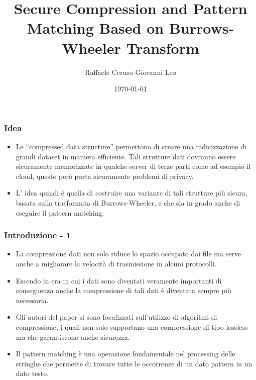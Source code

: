 \documentclass{beamer}
\title[]{Secure Compression and Pattern Matching Based on Burrows-Wheeler Transform}
\author{Raffaele Ceruso Giovanni Leo}
\date{\today}
\begin{document}
\begin{frame}
\titlepage
\end{frame}
\begin{frame}
\frametitle{Idea}
	\begin{itemize}
		\item Le ``compressed data structure'' permettono di creare una indicizzazione di grandi dataset in maniera efficiente. Tali strutture dati dovranno essere sicuramente memorizzate in qualche server di terze parti come ad esempio il cloud, questo però porta sicuramente problemi di privacy. 
		\item L’ idea quindi é quella di costruire una variante di tali strutture più sicura, basata sulla trasformata di Burrows-Wheeler, e che sia in grado anche di eseguire il pattern matching.
	\end{itemize}
\end{frame}
\begin{frame}
\frametitle{Introduzione - 1}
	\begin{itemize}
	 \item La compressione dati non solo riduce lo spazio occupato dai file ma serve anche a migliorare la velocità di trasmissione in alcuni protocolli.
	 
	 \item Essendo in era in cui i dati sono diventati veramente importanti di conseguenza anche la compressione di tali dati è diventata sempre più necessaria.
	 
	 \item Gli autori del paper si sono focalizzati sull’utilizzo di algoritmi di compressione, i quali non solo supportano una compressione di tipo lossless ma che garantiscono anche sicurezza.
	 
	 \item Il pattern matching è una operazione fondamentale nel processing delle stringhe che permette di trovare tutte le occorrenze di un dato pattern in un dato testo.
	 \end{itemize}
\end{frame}
\end{document}
